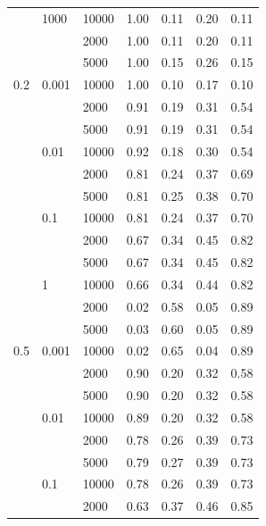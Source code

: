 \documentclass[a4paper,10pt]{article}
\begin{document}
\begin{table}[!ht]
\begin{multicols}{2}
\begin{scriptsize}
\begin{tabular}{|lllrrrr|}
      & 1000 & 10000 &       1.00 &       0.11 &       0.20 &       0.11 \\
      &       & 2000 &       1.00 &       0.11 &       0.20 &       0.11 \\
      &       & 5000 &       1.00 &       0.15 &       0.26 &       0.15 \\
0.2 & 0.001 & 10000 &       1.00 &       0.10 &       0.17 &       0.10 \\
      &       & 2000 &       0.91 &       0.19 &       0.31 &       0.54 \\
      &       & 5000 &       0.91 &       0.19 &       0.31 &       0.54 \\
      & 0.01 & 10000 &       0.92 &       0.18 &       0.30 &       0.54 \\
      &       & 2000 &       0.81 &       0.24 &       0.37 &       0.69 \\
      &       & 5000 &       0.81 &       0.25 &       0.38 &       0.70 \\
      & 0.1 & 10000 &       0.81 &       0.24 &       0.37 &       0.70 \\
      &       & 2000 &       0.67 &       0.34 &       0.45 &       0.82 \\
      &       & 5000 &       0.67 &       0.34 &       0.45 &       0.82 \\
      & 1 & 10000 &       0.66 &       0.34 &       0.44 &       0.82 \\
      &       & 2000 &       0.02 &       0.58 &       0.05 &       0.89 \\
      &       & 5000 &       0.03 &       0.60 &       0.05 &       0.89 \\
0.5 & 0.001 & 10000 &       0.02 &       0.65 &       0.04 &       0.89 \\
      &       & 2000 &       0.90 &       0.20 &       0.32 &       0.58 \\
      &       & 5000 &       0.90 &       0.20 &       0.32 &       0.58 \\
      & 0.01 & 10000 &       0.89 &       0.20 &       0.32 &       0.58 \\
      &       & 2000 &       0.78 &       0.26 &       0.39 &       0.73 \\
      &       & 5000 &       0.79 &       0.27 &       0.39 &       0.73 \\
      & 0.1 & 10000 &       0.78 &       0.26 &       0.39 &       0.73 \\
      &       & 2000 &       0.63 &       0.37 &       0.46 &       0.85 \\

\end{tabular}
\end{scriptsize}
\end{multicols}
\end{table}
\end{document}
